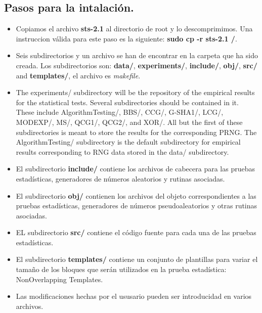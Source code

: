 \documentclass{llncs}
\theoremstyle{plane}
\begin{document}
\subsection{Pasos para la intalación.}
\begin{itemize}
\item Copiamos el archivo \textbf{sts-2.1} al directorio de root y lo descomprimimos. Una instruccion válida para este paso es la siguiente: \textbf{sudo cp -r sts-2.1  /}.

\item Seis subdirectorios y un archivo se han de encontrar en la carpeta que ha sido creada. Los subdirectorios son:
\textbf{data/}, \textbf{experiments/}, \textbf{include/}, \textbf{obj/}, \textbf{src/} and \textbf{templates/}, el archivo es \textit{makefile}.



\item The experiments/ subdirectory will be the repository of the empirical results for the
statistical tests. Several subdirectories should be contained in it. These include
AlgorithmTesting/, BBS/, CCG/, G-SHA1/, LCG/, MODEXP/, MS/, QCG1/,
QCG2/, and XOR/. All but the first of these subdirectories is meant to store the
results for the corresponding PRNG. The AlgorithmTesting/ subdirectory is the
default subdirectory for empirical results corresponding to RNG data stored in the
data/ subdirectory.
\item 	 El  subdirectorio \textbf{include/} contiene los archivos de cabecera para las pruebas estadísticas, generadores de números aleatorios y rutinas asociadas.

\item 	 El subdirectorio \textbf{obj/} contienen los archivos del objeto correspondientes a las pruebas estadísticas, generadores de números pseudoaleatorios y otras rutinas asociadas.

\item EL subdirectorio \textbf{src/} contiene el código fuente para cada una de las pruebas estadísticas.

\item 	El subdirectorio \textbf{templates/} contiene un conjunto de plantillas para variar el tamaño de los bloques que serán utilizados en la prueba estadística: NonOverlapping Templates.

\item Las modificaciones hechas por el ususario pueden ser introducidad en varios archivos.


\end{itemize}
\end{document}
